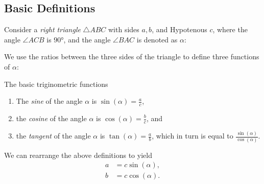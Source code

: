 \subsection{Basic Definitions}
Consider a \emph{right triangle} $\triangle ABC$ with sides $a,b$, and Hypotenous $c$, where the angle $\angle ACB$ is $\ang{90}$, and the angle $\angle BAC$ is denoted as $\alpha$:

\centering
{}
\flushleft

We use the ratios between the three sides of the triangle to define three functions of $\alpha$:
\begin{definition}{The basic triginometric functions}{}
	\vspace{5mm}
	\begin{enumerate}
		\item The \emph{sine} of the angle $\alpha$ is $\sin(\alpha)=\frac{a}{c}$,
		\item the \emph{cosine} of the angle $\alpha$ is $\cos(\alpha)=\frac{b}{c}$, and
		\item the \emph{tangent} of the angle $\alpha$ is $\tan(\alpha)=\frac{a}{b}$, which in turn is equal to $\frac{\sin(\alpha)}{\cos(\alpha)}$.
		\end{enumerate}
	\label{def:basic_trig}
\end{definition}

We can rearrange the above definitions to yield
\begin{align}
	a &= c\sin(\alpha),\nonumber\\
	b &= c\cos(\alpha).
	\label{eq:basic_trig_rearrange}
\end{align}

